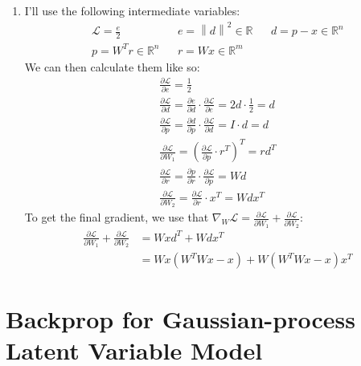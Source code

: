\documentclass[12pt]{article}
\newcommand{\norm}[1]{\left\lVert#1\right\rVert}
\newcommand{\loss}{\mathcal{L}}
\newcommand{\real}{\mathbb{R}}
\begin{document}
\begin{enumerate}[label=(\alph*)]
    \item I'll use the following intermediate variables:
          \begin{align*}
              \loss=\frac{e}{2}  &  & e=\norm{d}^2 \in \real &  & d=p-x \in \real^n \\
              p=W^Tr \in \real^n &  & r=Wx \in \real^m
          \end{align*}
          We can then calculate them like so:
          \begin{gather*}
              \frac{\partial \loss}{\partial e}=\frac{1}{2} \\
              \frac{\partial \loss}{\partial d}=\frac{\partial e}{\partial d} \cdot \frac{\partial \loss}{\partial e}=2d \cdot \frac{1}{2}=d \\
              \frac{\partial \loss}{\partial p}=\frac{\partial d}{\partial p} \cdot \frac{\partial \loss}{\partial d}=I \cdot d=d \\
              \frac{\partial \loss}{\partial W_1}=\left(\frac{\partial \loss}{\partial p} \cdot r^T\right)^T=rd^T \\
              \frac{\partial \loss}{\partial r}=\frac{\partial p}{\partial r} \cdot \frac{\partial \loss}{\partial p}=Wd \\
              \frac{\partial \loss}{\partial W_2}=\frac{\partial \loss}{\partial r} \cdot x^T=Wdx^T
          \end{gather*}
          To get the final gradient, we use that $\nabla_W \loss = \frac{\partial \loss}{\partial W_1}+\frac{\partial \loss}{\partial W_2}$:
          \begin{align*}
              \frac{\partial \loss}{\partial W_1}+\frac{\partial \loss}{\partial W_2}
               & = Wxd^T+Wdx^T                                             \\
               & = \boxed{Wx\left(W^TWx-x\right)+W\left(W^TWx-x\right)x^T}
          \end{align*}
\end{enumerate}

\pagebreak

\section{Backprop for Gaussian-process Latent Variable Model}
\end{document}
